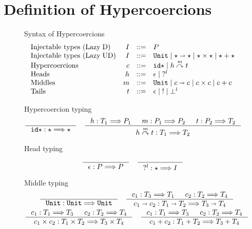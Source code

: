 \documentclass[acmsmall,review]{acmart}\settopmatter{printfolios=true,printccs=false,printacmref=false}
\newcommand{\stxrule}[3]{\text{#2} & #1 & ::= & #3\\}
\newcommand{\plus}[0]{+}
\newcommand{\lazyUD}{Lazy\;UD}
\newcommand{\lazyD}{Lazy\;D}
\newcommand{\TOOdyn}[0]{\star}
\newcommand{\POOunit}[0]{\mathtt{Unit}}
\newcommand{\POOfun}[2]{#1 \shortrightarrow #2}
\newcommand{\POOprod}[2]{#1 \times #2}
\newcommand{\POOsum}[2]{#1 \plus #2}
\newcommand{\typingHC}[3]{#1 : #2 \Longrightarrow #3}
\newcommand{\hyperCoercionI}[0]{\mathtt{id\star}}
\newcommand{\hyperCoercionC}[3]{#1 \overset{#2}{\curvearrowright} #3}
\begin{document}


\section{Definition of Hypercoercions} \label{sec:hypercoercion-definition}

\begin{figure}
  Syntax of Hypercoercions
  \[
  \begin{array}{lrcl}
  \stxrule{I}{Injectable types (\lazyD)}{P}
  \stxrule{I}{Injectable types (\lazyUD)}{
    \POOunit \mid
    \POOfun{\TOOdyn}{\TOOdyn} \mid
    \POOprod{\TOOdyn}{\TOOdyn} \mid
    \POOsum{\TOOdyn}{\TOOdyn}
  }
  \stxrule{c}{Hypercoercions}{
    \hyperCoercionI \mid{}
    \hyperCoercionC{h}{m}{t}
  }
  \stxrule{h}{Heads}{
    \epsilon \mid{}
    ?^l
  }
  \stxrule{m}{Middles}{
    \POOunit \mid
    \POOfun{c}{c} \mid
    \POOprod{c}{c} \mid
    \POOsum{c}{c}
  }
  \stxrule{t}{Tails}{
    \epsilon \mid{}
    ! \mid{}
    \bot^l
  }
  \end{array}
  \]
    
  Hypercoercion typing 
  \begin{gather*}
  \inference{}{\typingHC{\hyperCoercionI}{\TOOdyn}{\TOOdyn}}
  \quad
  \inference{
    \typingHC{h}{T_1}{P_1} &
    \typingHC{m}{P_1}{P_2} &
    \typingHC{t}{P_2}{T_2}
  }{
    \typingHC{\hyperCoercionC{h}{m}{t}}{T_1}{T_2}
  }
  \end{gather*}
  
  Head typing \fbox{$\typingHC{h}{T}{P}$}
  \begin{gather*}
  \inference{}{\typingHC{\epsilon}{P}{P}}
  \quad
  \inference{}{\typingHC{?^l}{\TOOdyn}{I}}
  \end{gather*}
  
  Middle typing \fbox{$\typingHC{m}{T}{T}$}
  \begin{gather*}
  \inference{}{\typingHC{\POOunit}{\POOunit}{\POOunit}}
  \quad
  \inference{
    \typingHC{c_1}{T_3}{T_1} &
    \typingHC{c_2}{T_2}{T_4}
  }{
    \typingHC{\POOfun{c_1}{c_2}}{\POOfun{T_1}{T_2}}{\POOfun{T_3}{T_4}}
  }
  \\
  \inference{
    \typingHC{c_1}{T_1}{T_3} &
    \typingHC{c_2}{T_2}{T_4}
  }{
    \typingHC{\POOprod{c_1}{c_2}}{\POOprod{T_1}{T_2}}{\POOprod{T_3}{T_4}}
  }
  \quad
  \inference{
    \typingHC{c_1}{T_1}{T_3} &
    \typingHC{c_2}{T_2}{T_4}
  }{
    \typingHC{\POOsum{c_1}{c_2}}{\POOsum{T_1}{T_2}}{\POOsum{T_3}{T_4}}
  }
    \end{gather*}
    

\end{figure}
\end{document}
